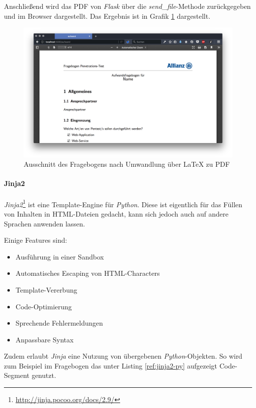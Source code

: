 Anschließend wird das PDF von \textit{Flask} über die \textit{send\_file}-Methode zurückgegeben und im Browser dargestellt. Das Ergebnis ist in Grafik \ref{fig:FragWebGen} dargestellt.

\begin{figure}[htbp]
	\centering
	\includegraphics[width=\textwidth]{bilder/pentest_prozesse/vorbereitung/fragebogen_web_gen.png}
	\caption{Ausschnitt des Fragebogens nach Umwandlung über LaTeX zu PDF}
	\label{fig:FragWebGen}
\end{figure}

\newpage
\paragraph{Jinja2}\label{jinja2}
\textit{Jinja2}\footnote{\url{http://jinja.pocoo.org/docs/2.9/}} ist eine Template-Engine für \textit{Python}. Diese ist eigentlich für das Füllen von Inhalten in HTML-Dateien gedacht, kann sich jedoch auch auf andere Sprachen anwenden lassen.

Einige Features sind:
\begin{itemize}
    \item Ausführung in einer Sandbox
    \item Automatisches Escaping von HTML-Characters
    \item Template-Vererbung
    \item Code-Optimierung
    \item Sprechende Fehlermeldungen
    \item Anpassbare Syntax
\end{itemize}

Zudem erlaubt \textit{Jinja} eine Nutzung von übergebenen \textit{Python}-Objekten. So wird zum Beispiel im Fragebogen das unter Listing \ref{ref:jinja2-py} aufgezeigt Code-Segment genutzt.\\

